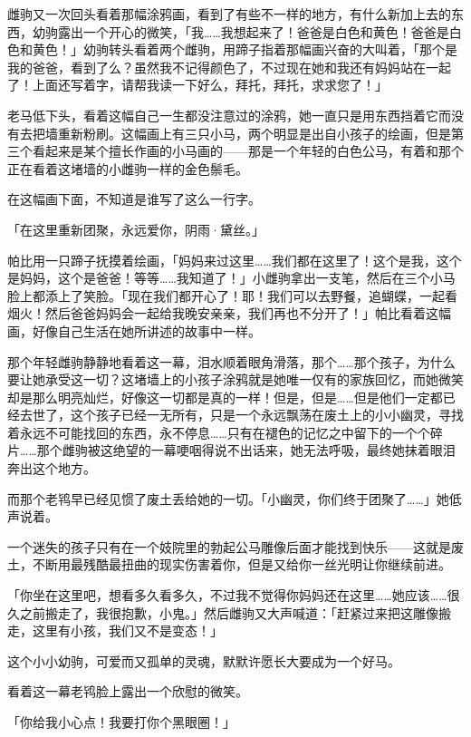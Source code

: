 雌驹又一次回头看着那幅涂鸦画，看到了有些不一样的地方，有什么新加上去的东西，幼驹露出一个开心的微笑，「我……我想起来了！爸爸是白色和黄色！爸爸是白色和黄色！」幼驹转头看着两个雌驹，用蹄子指着那幅画兴奋的大叫着，「那个是我的爸爸，看到了么？虽然我不记得颜色了，不过现在她和我还有妈妈站在一起了！上面还写着字，请帮我读一下好么，拜托，拜托，求求您了！」

老马低下头，看着这幅自己一生都没注意过的涂鸦，她一直只是用东西挡着它而没有去把墙重新粉刷。这幅画上有三只小马，两个明显是出自小孩子的绘画，但是第三个看起来是某个擅长作画的小马画的——那是一个年轻的白色公马，有着和那个正在看着这堵墙的小雌驹一样的金色鬃毛。

在这幅画下面，不知道是谁写了这么一行字。

「在这里重新团聚，永远爱你，阴雨·黛丝。」

帕比用一只蹄子抚摸着绘画，「妈妈来过这里……我们都在这里了！这个是我，这个是妈妈，这个是爸爸！等等……我知道了！」小雌驹拿出一支笔，然后在三个小马脸上都添上了笑脸。「现在我们都开心了！耶！我们可以去野餐，追蝴蝶，一起看烟火！然后爸爸妈妈会一起给我晚安亲亲，我们再也不分开了！」帕比看着这幅画，好像自己生活在她所讲述的故事中一样。

那个年轻雌驹静静地看着这一幕，泪水顺着眼角滑落，那个……那个孩子，为什么要让她承受这一切？这堵墙上的小孩子涂鸦就是她唯一仅有的家族回忆，而她微笑却是那么明亮灿烂，好像这一切都是真的一样！但是，但是……但是他们一定都已经去世了，这个孩子已经一无所有，只是一个永远飘荡在废土上的小小幽灵，寻找着永远不可能找回的东西，永不停息……只有在褪色的记忆之中留下的一个个碎片……那个雌驹被这绝望的一幕哽咽得说不出话来，她无法呼吸，最终她抹着眼泪奔出这个地方。

而那个老鸨早已经见惯了废土丢给她的一切。「小幽灵，你们终于团聚了……」她低声说着。

一个迷失的孩子只有在一个妓院里的勃起公马雕像后面才能找到快乐——这就是废土，不断用最残酷最扭曲的现实伤害着你，但是又给你一丝光明让你继续前进。

「你坐在这里吧，想看多久看多久，不过我不觉得你妈妈还在这里……她应该……很久之前搬走了，我很抱歉，小鬼。」然后雌驹又大声喊道：「赶紧过来把这雕像搬走，这里有小孩，我们又不是变态！」

这个小小幼驹，可爱而又孤单的灵魂，默默许愿长大要成为一个好马。

看着这一幕老鸨脸上露出一个欣慰的微笑。

\horizonline


「你给我小心点！我要打你个黑眼圈！」

